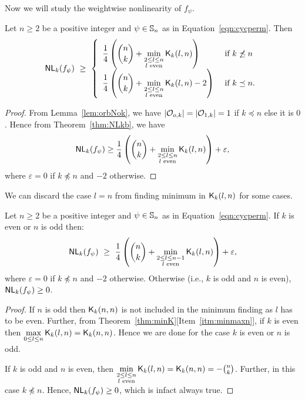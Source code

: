 \documentclass{llncs}
\begin{document}
Now we will study the weightwise nonlinearity of $f_\psi$.
\begin{theorem}\label{thm:NLk_bound}
Let $n \geq 2$ be a positive integer and $\psi \in \mathbb{S}_n$ as in  Equation~\ref{eqn:cycperm}.
Then $$\mathsf{NL}_{k}(f_\psi) ~\geq ~ 
\left\{ \begin{array}{ll}
\displaystyle{\frac{1}{4}\left({n \choose k} + \min_{\substack{2 \leq l \leq n \\ l \text{ even}}} \mathsf{K}_{k}(l,n)\right)}  & \text{ if }  k \not\preceq n \\
\displaystyle{\frac{1}{4}\left({n \choose k} + \min_{\substack{2 \leq l \leq n \\ l \text{ even}}} \mathsf{K}_{k}(l,n) - 2\right)} & \text{ if } k \preceq n.
\end{array}   \right.$$
\end{theorem}
\begin{proof}
From Lemma~\ref{lem:orbNok}, we have $|\mathcal{O}_{o,k}| = |\mathcal{O}_{1,k}| = 1$ if 
$k \preceq n$ else it is $0$. Hence from Theorem~\ref{thm:NLkb}, we have
$$\mathsf{NL}_{k}(f_\psi) \geq 
\displaystyle{\frac{1}{4}\left({n \choose k} + \min_{\substack{2 \leq l \leq n \\ l \text{ even}}} \mathsf{K}_{k}(l,n)\right)} + \varepsilon,$$
where $\varepsilon=0$ if $k \not\preceq n$ and $-2$ otherwise.
\end{proof}

We can discard the case $l = n$ from finding minimum in $\mathsf{K}_{k}(l,n)$ for some cases.
\begin{corollary}\label{cor:NLk_bound}
Let $n \geq 2$ be a positive integer and $\psi \in \mathbb{S}_n$ as in Equation~\ref{eqn:cycperm}. If $k$ is even or $n$ is odd then:
$$\mathsf{NL}_{k}(f_\psi) ~\geq ~ 
\displaystyle{\frac{1}{4}\left({n \choose k} + \min_{\substack{2 \leq l \leq n-1 \\ l \text{ even}}} \mathsf{K}_{k}(l,n)\right)}  + \varepsilon,$$
where $\varepsilon =0$ if $k \not\preceq n$ and $-2$ otherwise.
Otherwise (i.e., $k$ is odd and $n$ is even), $\mathsf{NL}_{k}(f_\psi) \geq 0$.
\end{corollary}
\begin{proof}
If $n$ is odd then $\mathsf{K}_{k}(n,n)$ is not included in the minimum finding as $l$ has to be even. Further, from Theorem~\ref{thm:minK}[Item~\ref{itm:minmaxn}], if $k$ is even then $\max\limits_{0 \leq l \leq n} \mathsf{K}_{k}(l,n) = \mathsf{K}_{k}(n,n)$. 
Hence we are done for the case $k$ is even or $n$ is odd.

If $k$ is odd and $n$ is even, then $\min\limits_{\substack{2 \leq l \leq n \\ l \text{ even}}} \mathsf{K}_{k}(l,n) = \mathsf{K}_{k}(n,n) = -{n \choose k}$. Further, in this case $k \not\preceq n$. Hence, $\mathsf{NL}_{k}(f_\psi) \geq 0$, which is infact always true.
\end{proof}
\end{document}
